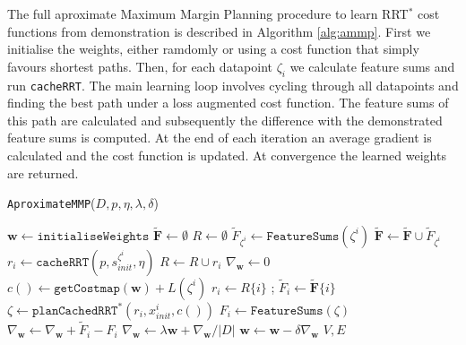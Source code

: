 \documentclass{article}  %
\begin{document}
	The full aproximate Maximum Margin Planning procedure to learn RRT$^*$ cost functions from demonstration is described in Algorithm \ref{alg:ammp}. First we initialise the weights, either ramdomly or using a cost function that simply favours shortest paths. Then, for each datapoint $\zeta_i$ we calculate feature sums and run \texttt{cacheRRT}. The main learning loop involves cycling through all datapoints and finding the best path under a loss augmented cost function. The feature sums of this path are calculated and subsequently the difference with the demonstrated feature sums is computed. At the end of each iteration an average gradient is calculated and the cost function is updated. At convergence the learned weights are returned.

	\begin{algorithm}
	\caption{\texttt{AproximateMMP}($D,p,\eta,\lambda,\delta$)\label{alg:ammp}}
	 \label{alg:plan_cached}
	\begin{algorithmic}[1]
	\STATE $\mathbf{w} \gets \texttt{initialiseWeights}$
	\STATE $\mathbf{\tilde{F}} \gets \emptyset$
	\STATE $R \gets \emptyset$
	\STATE $\tilde{F}_{\zeta^i} \gets \texttt{FeatureSums}(\zeta^i)$
	\STATE $\mathbf{\tilde{F}} \gets \mathbf{\tilde{F}} \cup \tilde{F}_{\zeta^i}$
	\STATE $r_i \gets \texttt{cacheRRT}(p,s_{init}^{\zeta^i},\eta)$
	\STATE $R \gets R \cup r_i $
	\ENDFOR
	\REPEAT
	\STATE $\nabla_{\mathbf{w}}\gets 0$
	\STATE $c() \gets \texttt{getCostmap}(\mathbf{w}) + L(\zeta^i)$ 
	\STATE $r_i \gets R\{i\}$ ;	$\tilde{F}_i \gets \mathbf{\tilde{F}}\{i\}$ 
	\STATE $\zeta \gets \texttt{planCachedRRT}^*(r_i,x^i_{init},c())$
	\STATE $F_i \gets \texttt{FeatureSums}(\zeta)$
	\STATE $\nabla_{\mathbf{w}} \gets \nabla_{\mathbf{w}} + \tilde{F}_i - F_i $
	\ENDFOR
	\STATE $\nabla_{\mathbf{w}} \gets \lambda\mathbf{w} + \nabla_{\mathbf{w}} / |D|$
	\STATE $\mathbf{w} \gets \mathbf{w} - \delta\nabla_{\mathbf{w}} $
	\RETURN $V,E$

	\end{algorithmic}
	\end{algorithm}

\end{document}
